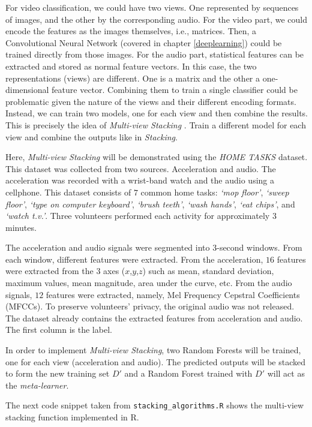 \documentclass[
  11pt,
]{krantz}
\begin{document}
For video classification, we could have two views. One represented by sequences of images, and the other by the corresponding audio. For the video part, we could encode the features as the images themselves, i.e., matrices. Then, a Convolutional Neural Network (covered in chapter \ref{deeplearning}) could be trained directly from those images. For the audio part, statistical features can be extracted and stored as normal feature vectors. In this case, the two representations (views) are different. One is a matrix and the other a one-dimensional feature vector. Combining them to train a single classifier could be problematic given the nature of the views and their different encoding formats. Instead, we can train two models, one for each view and then combine the results. This is precisely the idea of \emph{Multi-view Stacking} \citep{garcia2018multiview}. Train a different model for each view and combine the outputs like in \emph{Stacking}.

Here, \emph{Multi-view Stacking} will be demonstrated using the \emph{HOME TASKS} dataset. This dataset was collected from two sources. Acceleration and audio. The acceleration was recorded with a wrist-band watch and the audio using a cellphone. This dataset consists of \(7\) common home tasks: \emph{`mop floor'}, \emph{`sweep floor'}, \emph{`type on computer keyboard'}, \emph{`brush teeth'}, \emph{`wash hands'}, \emph{`eat chips'}, and \emph{`watch t.v.'}. Three volunteers performed each activity for approximately \(3\) minutes.

The acceleration and audio signals were segmented into \(3\)-second windows. From each window, different features were extracted. From the acceleration, \(16\) features were extracted from the \(3\) axes (\(x\),\(y\),\(z\)) such as mean, standard deviation, maximum values, mean magnitude, area under the curve, etc. From the audio signals, \(12\) features were extracted, namely, Mel Frequency Cepstral Coefficients (MFCCs). To preserve volunteers' privacy, the original audio was not released. The dataset already contains the extracted features from acceleration and audio. The first column is the label.

In order to implement \emph{Multi-view Stacking}, two Random Forests will be trained, one for each view (acceleration and audio). The predicted outputs will be stacked to form the new training set \(D'\) and a Random Forest trained with \(D'\) will act as the \emph{meta-learner}.

The next code snippet taken from \texttt{stacking\_algorithms.R} shows the multi-view stacking function implemented in R.
\end{document}
